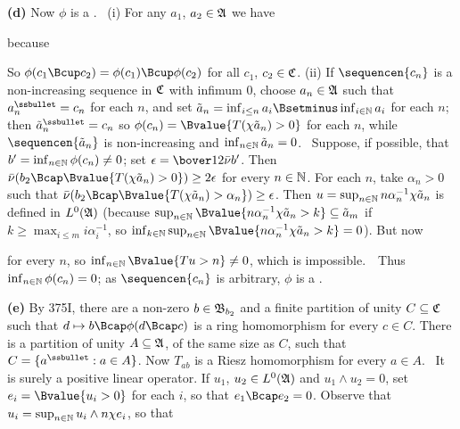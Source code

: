 {\medskip

{\bf (d)} Now $\phi$ is a \ssbhm.   \Prf\ (i) For any
$a_1$, $a_2\in\frak A$ we have


\noindent because


\noindent So $\phi(c_1\Bcup c_2)=\phi(c_1)\Bcup\phi(c_2)$ for all $c_1$,
$c_2\in\frak C$.   (ii) If $\sequencen{c_n}$ is a non-increasing
sequence in $\frak C$ with infimum $0$, choose $a_n\in\frak A$ such that
$a_n^{\ssbullet}=c_n$ for each $n$, and set
$\tilde a_n=\inf_{i\le n}a_i\Bsetminus\inf_{i\in\Bbb N}a_i$ for each
$n$;  then $\tilde a_n^{\ssbullet}=c_n$ so
$\phi(c_n)=\Bvalue{T(\chi\tilde a_n)>0}$ for
each $n$, while $\sequencen{\tilde a_n}$ is non-increasing and
$\inf_{n\in\Bbb N}\tilde a_n=0$.   \Quer\ Suppose, if possible, that
$b'=\inf_{n\in\Bbb N}\phi(c_n)\ne 0$;  set
$\epsilon=\bover12\bar\nu b'$.   Then
$\bar\nu(b_2\Bcap\Bvalue{T(\chi\tilde a_n)>0})\ge 2\epsilon$ for every
$n\in\Bbb N$.   For each $n$, take $\alpha_n>0$ such that
$\bar\nu(b_2\Bcap\Bvalue{T(\chi\tilde a_n)>\alpha_n})\ge\epsilon$.
Then $u=\sup_{n\in\Bbb N}n\alpha_n^{-1}\chi\tilde a_n$ is defined in
$L^0(\frak A)$ (because
$\sup_{n\in\Bbb N}\Bvalue{n\alpha_n^{-1}\chi\tilde a_n>k}
\subseteq\tilde a_m$ if $k\ge\max_{i\le m}i\alpha_i^{-1}$, so
$\inf_{k\in\Bbb N}\sup_{n\in\Bbb N}
\Bvalue{n\alpha_n^{-1}\chi\tilde a_n>k}=0$).   But now


\noindent for every $n$, so $\inf_{n\in\Bbb N}\Bvalue{Tu>n}\ne 0$, which
is impossible.\ \BanG\   Thus $\inf_{n\in\Bbb N}\phi(c_n)=0$;  as
$\sequencen{c_n}$ is arbitrary, $\phi$ is a \ssbhm.\
\Qed

\medskip

{\bf (e)} By 375I, there are a non-zero $b\in\frak B_{b_2}$ and a finite
partition of unity $C\subseteq\frak C$ such that $d\mapsto
b\Bcap\phi(d\Bcap c)$ is a ring homomorphism for every $c\in C$.   There
is a partition of unity $A\subseteq\frak A$, of the same size as $C$,
such that $C=\{a^{\ssbullet}:a\in A\}$.   Now $T_{ab}$ is a Riesz
homomorphism for every $a\in A$.   \Prf\ It is surely a positive linear
operator.   If $u_1$, $u_2\in L^0(\frak A)$ and $u_1\wedge u_2=0$, set
$e_i=\Bvalue{u_i>0}$ for each $i$, so that $e_1\Bcap e_2=0$.   Observe
that $u_i=\sup_{n\in\Bbb N}u_i\wedge n\chi e_i$, so that

}

